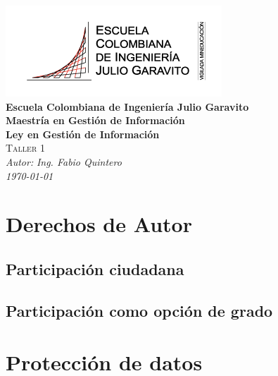 \documentclass[
letterpaper,
12pt,
singlespacing,
headsepline]{article}
\begin{document}
	\begin{titlepage}
	   \begin{center}
			\includegraphics[scale=0.5]{Images/1110_logotipo_institucional_vm300px.png} \\
		    \Large{\textbf{Escuela Colombiana de Ingeniería Julio Garavito}\vspace{2cm}}\\
		    \textbf{Maestría en Gestión de Información}\vspace{1cm}\\
		    \textbf{Ley en Gestión de Información}\vspace{1cm}\\
			\textsc{Taller 1} \vspace{2cm}  \\   
			\emph{Autor:} \textit{Ing. Fabio Quintero}\vspace{5cm}\\
	     \textit{\today}\\

	   \end{center}
	\end{titlepage}
	






\section{Derechos de Autor}

\subsection{Participación ciudadana}


\subsection{Participación como opción de grado}


\section{Protección de datos}
\end{document}
